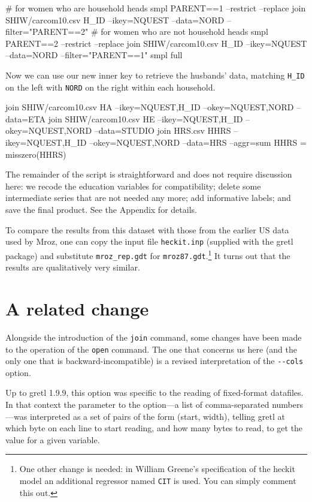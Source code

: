 %
\begin{code}
# for women who are household heads
smpl PARENT==1 --restrict --replace
join SHIW/carcom10.csv H_ID --ikey=NQUEST --data=NORD --filter="PARENT==2"
# for women who are not household heads
smpl PARENT==2 --restrict --replace
join SHIW/carcom10.csv H_ID --ikey=NQUEST --data=NORD --filter="PARENT==1"
smpl full
\end{code}
%
Now we can use our new inner key to retrieve the husbands' data,
matching \verb|H_ID| on the left with \texttt{NORD} on the right
within each household.
%
\begin{code}
join SHIW/carcom10.csv HA --ikey=NQUEST,H_ID --okey=NQUEST,NORD --data=ETA
join SHIW/carcom10.csv HE --ikey=NQUEST,H_ID --okey=NQUEST,NORD --data=STUDIO
join HRS.csv HHRS --ikey=NQUEST,H_ID --okey=NQUEST,NORD --data=HRS --aggr=sum
HHRS = misszero(HHRS)
\end{code}
%
The remainder of the script is straightforward and does not require
discussion here: we recode the education variables for compatibility;
delete some intermediate series that are not needed any more; add
informative labels; and save the final product. See the Appendix for
details.

To compare the results from this dataset with those from the earlier
US data used by Mroz, one can copy the input file \texttt{heckit.inp}
(supplied with the gretl package) and substitute \verb|mroz_rep.gdt|
for \texttt{mroz87.gdt}.\footnote{One other change is needed: in
  William Greene's specification of the heckit model an additional
  regressor named \texttt{CIT} is used. You can simply comment this
  out.} It turns out that the results are qualitatively very similar.

\section{A related change}
\label{sec:join-cols}

Alongside the introduction of the \texttt{join} command, some changes
have been made to the operation of the \texttt{open} command. The one
that concerns us here (and the only one that is backward-incompatible)
is a revised interpretation of the \verb|--cols| option. 

Up to gretl 1.9.9, this option was specific to the reading of
fixed-format datafiles. In that context the parameter to the
option---a list of comma-separated numbers---was interpreted as a set
of pairs of the form (start, width), telling gretl at which byte on
each line to start reading, and how many bytes to read, to get the
value for a given variable.

